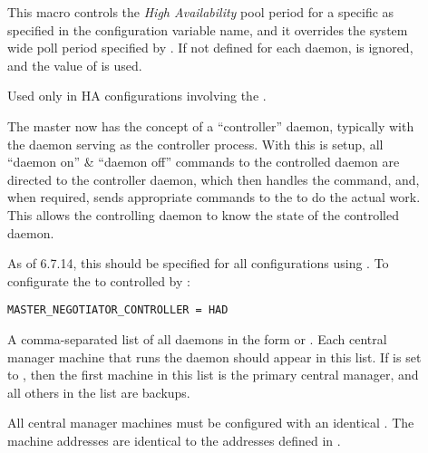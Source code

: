 \begin{description}
\item[]
  \label{param:HALockPolldaemonPeriod}
  This macro controls the \emph{High Availability} pool period
  for a specific 
  as specified in the configuration variable name,
  and it overrides the system wide poll period specified by
  .
  If not defined for each daemon,
   is ignored,
  and the value of  is used.

\item[]
  \label{param:Master<Name>Controller} Used only in HA configurations
  involving the .

  The master now has the concept of a ``controller'' daemon, typically
  with the  daemon serving as the controller process.
  With this is setup, all ``daemon on'' \& ``daemon off'' commands to
  the controlled daemon are directed to the controller daemon, which
  then handles the command, and, when required, sends appropriate
  commands to the  to do the actual work.  This allows
  the controlling daemon to know the state of the controlled daemon.

  As of 6.7.14, this should be specified for all configurations using
  .   To configurate the 
  to controlled by :

\begin{verbatim}
MASTER_NEGOTIATOR_CONTROLLER = HAD
\end{verbatim}


\item[]
  \label{param:HADList}
  A comma-separated list of all  daemons
  in the form  or .
  Each central manager machine that runs the  daemon
  should appear in this list.
  If  is set to ,
  then the first machine in this list is the primary central
  manager, and all others in the list are backups.

  All central manager machines must be configured with 
  an identical .
  The machine addresses are identical to the addresses defined
  in .

%
%
%
%


\end{description}
